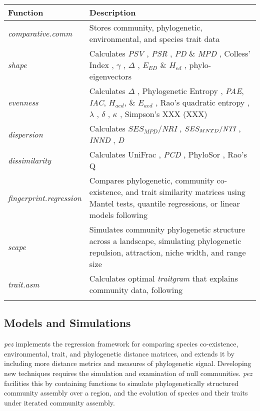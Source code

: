 \documentclass{bioinfo}
\begin{document}
\begin{table*}
  {\begin{tabular}{p{2.5cm} p{15cm}}\toprule
      Function & Description\\\midrule
      \emph{comparative.comm} & Stores community, phylogenetic, environmental, and species trait data\\
      \emph{shape} & Calculates \emph{PSV} \citep{Helmus2007}, \emph{PSR} \citep{Helmus2007}, \emph{PD} \& \emph{MPD} \citep{Faith1992}, Colless' Index \citep{Colless1982}, $\gamma$ \citep{Pybus2000}, $\Delta$ \citep{Warwick1995}, $E_{ED}$ \& $H_{ed}$ \citep{Cadotte2010}, phylo-eigenvectors \citep{Diniz-Filho2011}\\
      \emph{evenness} & Calculates $\Delta$ \citep{Warwick1995}, Phylogenetic Entropy \citep{Allen2009}, \emph{PAE}, \emph{IAC}, $H_{aed}$, \& $E_{aed}$ \citep{Cadotte2010}, Rao's quadratic entropy \citep{Rao1982a}, $\lambda$ \citep{Pagel1999}, $\delta$ \citep{Pagel1999}, $\kappa$ \citep{Pagel1999}, Simpson's XXX (XXX)\\
      \emph{dispersion} & Calculates $SES_{MPD}$/\emph{NRI} \citep{Webb2000,Webb2002,Kembel2009}, $SES_{MNTD}/\emph{NTI}$ \citep{Webb2000,Webb2002,Kembel2009}, \emph{INND} \citep{Ness2011}, \emph{D} \citep{Fritz2010}\\
      \emph{dissimilarity} &  Calculates UniFrac \citep{Lozupone2005}, \emph{PCD} \citep{Helmus2010}, PhyloSor \citep{Bryant2008}, Rao's Q \citep{Rao1982a}\\
      \emph{fingerprint.regression} & Compares phylogenetic, community co-existence, and trait similarity matrices using Mantel tests, quantile regressions, or linear models following \citep{Cavender-Bares2004,Cavender-Bares2006} \\
      \emph{scape} & Simulates community phylogenetic structure across a landscape, simulating phylogenetic repulsion, attraction, niche width, and range size \citep{Helmus2012}\\
      \emph{trait.asm} & Calculates optimal \emph{traitgram} that explains community data, following \citep{Cadotte2013}\\
      \botrule
\end{tabular}}{}
\end{table*}
\subsection{Models and Simulations}
\emph{pez} implements the \citet{Cavender-Bares2004} regression
framework for comparing species co-existence, environmental, trait,
and phylogenetic distance matrices, and extends it by including more
distance metrics and measures of phylogenetic signal. Developing new
techniques requires the simulation and examination of null
communities. \emph{pez} facilities this by containing functions to
simulate phylogenetically structured community assembly over a region,
and the evolution of species and their traits under iterated community
assembly.
\end{document}
